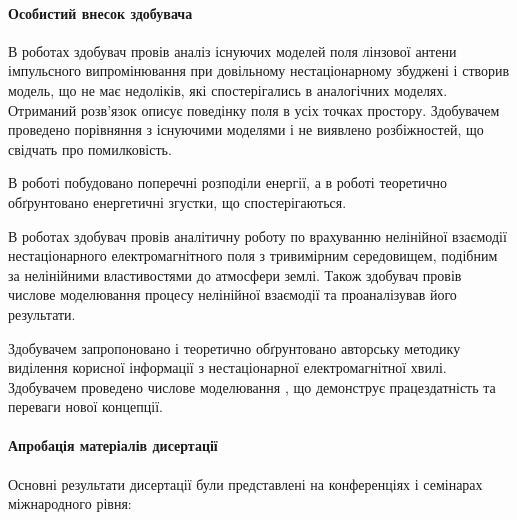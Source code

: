 \paragraph{Особистий внесок здобувача}

В роботах \cite{my:Telecom2018, my:UKRCON2017, my:UKRCON2019} здобувач провів
аналіз існуючих моделей поля лінзової антени імпульсного випромінювання 
при довільному нестаціонарному збуджені і створив модель, що не має недоліків,
які спостерігались в аналогічних моделях. Отриманий розв'язок описує 
поведінку поля в усіх точках простору. Здобувачем проведено порівняння з 
існуючими моделями і не виявлено розбіжностей, що свідчать про помилковість.

В роботі \cite{my:Vesnik2017-2} побудовано поперечні розподіли енергії, а
в роботі \cite{imp:Vesnik2018} теоретично обґрунтовано енергетичні згустки, 
що спостерігаються.

В роботах \cite{my:Vesnik2015, my:Vesnik2017, my:Vesnik2017-2, my:MMET2014, 
my:UWBUSIS2014, my:ICATT2015, my:UWBUSIS2016, my:KPI2016, my:DIPED2019} 
здобувач провів аналітичну роботу по врахуванню нелінійної взаємодії 
нестаціонарного електромагнітного поля з тривимірним середовищем, 
подібним за нелінійними властивостями до атмосфери землі. Також здобувач
провів числове моделювання процесу нелінійної взаємодії та проаналізував 
його результати.

Здобувачем запропоновано \cite{my:UWBUSIS2018} і теоретично обґрунтовано
\cite{my:a202004038} авторську методику виділення корисної інформації 
з нестаціонарної електромагнітної хвилі. Здобувачем проведено числове 
моделювання \cite{my:a202004038}, що демонструє працездатність 
та переваги нової концепції.

\paragraph{Апробація матеріалів дисертації}

Основні результати дисертації були представлені на конференціях і 
семінарах міжнародного рівня:

